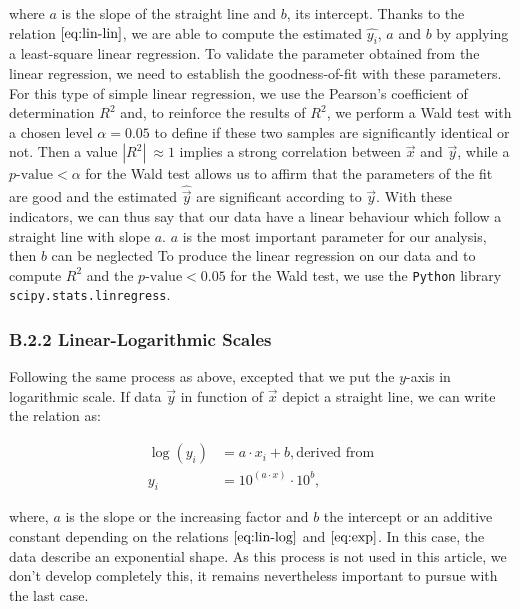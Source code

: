 \documentclass[unnumsec,webpdf,contemporary,large]{oup-authoring-template}%
\theoremstyle{thmstyleone}%
\theoremstyle{thmstyletwo}%
\theoremstyle{thmstylethree}%
\begin{document}
\begin{appendices}
    where $a$ is the slope of the straight line and $b$, its intercept. Thanks to the relation $\eqref{eq:lin-lin}$, we are able to compute the estimated $\hat{y_i}$, $a$ and $b$ by applying a least-square linear regression. To validate the parameter obtained from the linear regression, we need to establish the goodness-of-fit with these parameters. For this type of simple linear regression, we use the Pearson's coefficient of determination $R^2$ and, to reinforce the results of $R^2$, we perform a Wald test with a chosen level $\alpha = 0.05$ to define if these two samples are significantly identical or not. Then a value $|R^2| ~\approx 1$ implies a strong correlation between $\overrightarrow{x}$ and $\overrightarrow{y}$, while a $p\textrm{-value} < \alpha$  for the Wald test allows us to affirm that the parameters of the fit are good and the estimated $\hat{\overrightarrow{y}}$ are significant according to $\overrightarrow{y}$. With these indicators, we can thus say that our data have a linear behaviour which follow a straight line with slope $a$. $a$ is the most important parameter for our analysis, then $b$ can be neglected 
    To produce the linear regression on our data and to compute $R^2$ and the $p\textrm{-value} < 0.05$ for the Wald test, we use the \verb?Python? library \verb?scipy.stats.linregress?.\\
    
    \subsubsection{B.2.2 Linear-Logarithmic Scales}
    \label{subsub:lin-log}
    
    Following the same process as above, excepted that we put the $y$-axis in logarithmic scale. If data $\overrightarrow{y}$ in function of $\overrightarrow{x}$ depict a straight line, we can write the relation as: 
    
    \begin{align}
    \log(y_i) &= a \cdot x_i + b, \textrm{derived from} \label{eq:lin-log}\\
    y_i &= 10^{(a \cdot x )} \cdot 10^b \label{eq:exp},
    \end{align}
    
    where, $a$ is the slope or the increasing factor and $b$ the intercept or an additive constant depending on the relations $\eqref{eq:lin-log}$ and $\eqref{eq:exp}$. In this case, the data describe an exponential shape. As this process is not used in this article, we don't develop completely this, it remains nevertheless important to pursue with the last case.\\
    

\end{appendices}
\end{document}
